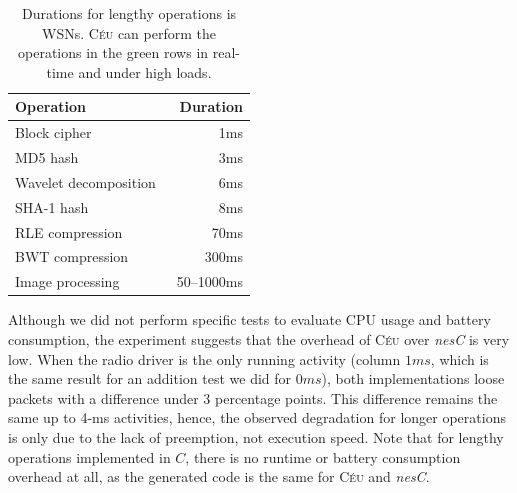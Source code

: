 \documentclass[letterpaper]{sig-alternate}
\newcommand{\CEU}{\textsc{C\'{e}u}\xspace}
\begin{document}

\begin{table}[t]
\begin{center}
\begin{tabular}{ | l | r | }
\hline
\rowcolor{darkgray}
    Operation          & Duration  \\ \hline
\hline
\rowcolor{lightgreen}
    Block cipher~\cite{wsn.tinysec,wsn.crypto}  & 1ms           \\ \hline
\rowcolor{lightgreen}
    MD5 hash~\cite{wsn.crypto}                  & 3ms           \\ \hline
\rowcolor{lightgreen}
    Wavelet decomposition~\cite{wsn.wavelet}    & 6ms           \\ \hline
\hline
\rowcolor{lightred}
    SHA-1 hash~\cite{wsn.crypto}                & 8ms           \\ \hline
\rowcolor{lightred}
    RLE compression~\cite{wsn.compression}      & 70ms          \\ \hline
\rowcolor{lightred}
    BWT compression~\cite{wsn.compression}      & 300ms         \\ \hline
\rowcolor{lightred}
    Image processing~\cite{wsn.cyclops}         & 50--1000ms    \\ \hline
\end{tabular}
\caption{Durations for lengthy operations is WSNs. \newline
{\small %
\CEU can perform the operations in the green rows in real-time and under high 
loads.
}%
\label{tab.durs}
}
\end{center}
\end{table}

Although we did not perform specific tests to evaluate CPU usage and battery 
consumption, the experiment suggests that the overhead of \CEU over \emph{nesC} 
is very low.
%
When the radio driver is the only running activity (column $1ms$, which is the 
same result for an addition test we did for $0ms$), both implementations loose 
packets with a difference under 3 percentage points.
This difference remains the same up to 4-ms activities, hence, the observed 
degradation for longer operations is only due to the lack of preemption, not 
execution speed.
%
Note that for lengthy operations implemented in $C$, there is no runtime or 
battery consumption overhead at all, as the generated code is the same for \CEU 
and \emph{nesC}.
\end{document}

